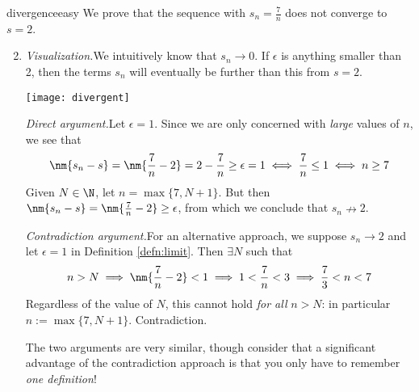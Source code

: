\begin{examples}{}{divergenceeasy}
	\exstart We prove that the sequence with $s_n=\frac 7n$ does not converge to $s=2$.
	\begin{enumerate}\setcounter{enumi}{1}
	  \item[]\emph{Visualization.}\quad We intuitively know that $s_n\to 0$. If $\epsilon$ is anything smaller than 2, then the terms $s_n$ will eventually be further than this from $s=2$.
	  \begin{center}
  		\texttt{[image: divergent]}
  	\end{center}
  	\vspace{-5pt}
	  
  	\emph{Direct argument.}\quad Let $\epsilon=1$. Since we are only concerned with \emph{large} values of $n$, we see that
  	\[\nm{s_n-s}=\nm{\frac 7n-2}=2-\frac 7n\ge \epsilon= 1\iff \frac 7n\le 1\iff n\ge 7\]
  	Given $N\in\N$, let\footnotemark{} $n=\max\{7,N+1\}$. But then $\nm{s_n-s}=\nm{\frac 7n-2}\ge\epsilon$, from which we conclude that $s_n\nrightarrow 2$.
  	\smallbreak
  	
  	\emph{Contradiction argument.}\quad For an alternative approach, we suppose $s_n\to 2$ and let $\epsilon=1$ in Definition \ref{defn:limit}. Then $\exists N$ such that
  	\[n>N\implies \nm{\frac 7n-2}<1 \implies 1<\frac 7n<3\implies \frac 73<n<7\]
  	Regardless of the value of $N$, this cannot hold \emph{for all} $n>N$: in particular $n:=\max\{7,N+1\}$. Contradiction.
  	\smallbreak
  	
  	The two arguments are very similar, though consider that a significant advantage of the contradiction approach is that you only have to remember \emph{one definition}!
	\end{enumerate}


\end{examples}
